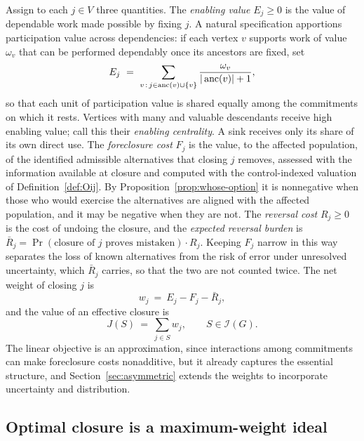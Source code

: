 Assign to each $j\in V$ three quantities. The \emph{enabling value} $E_j\geq 0$ is the value of dependable work made possible by fixing $j$. A natural specification apportions participation value across dependencies: if each vertex $v$ supports work of value $\omega_v$ that can be performed dependably once its ancestors are fixed, set
\begin{equation}\label{eq:enabling}
E_j\ =\ \sum_{v\,:\,j\in\anc(v)\cup\{v\}}\frac{\omega_v}{|\anc(v)|+1},
\end{equation}
so that each unit of participation value is shared equally among the commitments on which it rests. Vertices with many and valuable descendants receive high enabling value; call this their \emph{enabling centrality}. A sink receives only its share of its own direct use. The \emph{foreclosure cost} $F_j$ is the value, to the affected population, of the identified admissible alternatives that closing $j$ removes, assessed with the information available at closure and computed with the control-indexed valuation of Definition~\ref{def:Oij}. By Proposition~\ref{prop:whose-option} it is nonnegative when those who would exercise the alternatives are aligned with the affected population, and it may be negative when they are not. The \emph{reversal cost} $R_j\geq 0$ is the cost of undoing the closure, and the \emph{expected reversal burden} is $\bar R_j=\Pr(\text{closure of } j \text{ proves mistaken})\cdot R_j$. Keeping $F_j$ narrow in this way separates the loss of known alternatives from the risk of error under unresolved uncertainty, which $\bar R_j$ carries, so that the two are not counted twice. The net weight of closing $j$ is
\begin{equation}
w_j\ =\ E_j-F_j-\bar R_j,
\end{equation}
and the value of an effective closure is
\begin{equation}\label{eq:J}
J(S)\ =\ \sum_{j\in S}w_j,\qquad S\in\mathcal{I}(G).
\end{equation}
The linear objective is an approximation, since interactions among commitments can make foreclosure costs nonadditive, but it already captures the essential structure, and Section~\ref{sec:asymmetric} extends the weights to incorporate uncertainty and distribution.

\subsection{Optimal closure is a maximum-weight ideal}

